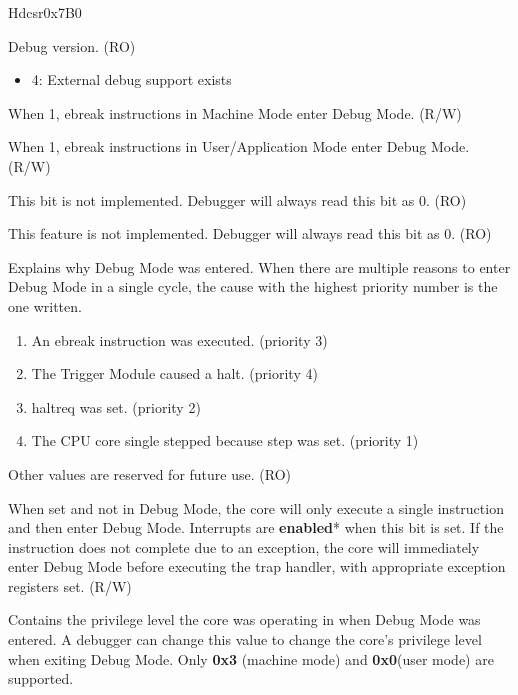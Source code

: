 
\begin{register}{H}{dcsr}{0x7B0}
\label{regdesc:DCSR}
%
%
%
%
%
%
%
%
%
%
%
%
\regnewline%
\begin{regdesc}
\begin{reglist}
\label{fielddesc:DCSRXEDBGVER}\item [xdebugver] Debug version. (RO)
\begin{itemize}
    \setlength\itemsep{-1em}
    \item 4: External debug support exists
\end{itemize}
\label{fielddesc:DCSREBREAKM}\item [ebreakm] When 1, ebreak instructions in Machine Mode enter Debug Mode. (R/W)
\label{fielddesc:DCSREBREAKU}\item [ebreaku] When 1, ebreak instructions in User/Application Mode enter Debug Mode. (R/W)
\label{fielddesc:DCSRSTOPCOUNT}\item [stopcount] This bit is not implemented. Debugger will always read this bit as 0. (RO)
\label{fielddesc:DCSRSTOPTIME}\item [stoptime] This feature is not implemented. Debugger will always read this bit as 0. (RO)
\label{fielddesc:DCSRCAUSE}\item [cause] Explains why Debug Mode was entered. When there are multiple reasons to enter Debug \newline Mode in a single cycle, the cause with the highest priority number is the one written.
\begin{enumerate}
    \setlength\itemsep{-1em}
    \item An ebreak instruction was executed. (priority 3)
    \item The Trigger Module caused a halt. (priority 4)
    \item haltreq was set. (priority 2)
    \item The CPU core single stepped because step was set. (priority 1)
\end{enumerate}
Other values are reserved for future use. (RO)
\label{fielddesc:DCSRSTEP}\item [step] When set and not in Debug Mode, the core will only execute a single instruction and then enter Debug Mode. Interrupts are \textbf{enabled}* when this bit is set. If the instruction does not complete due to an exception, the core will immediately enter Debug Mode before executing the trap handler, with appropriate exception registers set. (R/W)
\label{fielddesc:DCSRPRV}\item [prv] Contains the privilege level the core was operating in when Debug Mode was entered. A debugger can change this value to change the core's privilege level when exiting Debug Mode. Only \textbf{0x3} (machine mode) and \textbf{0x0}(user mode) are supported.
\end{reglist}
\end{regdesc}
\end{register}
